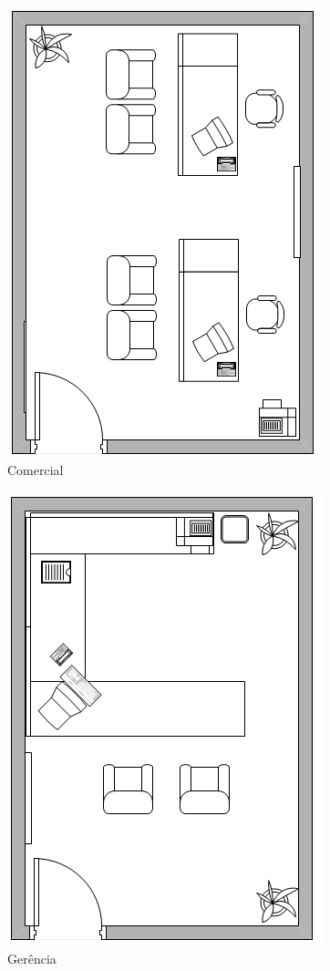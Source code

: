 \documentclass[	DIV=calc,%
							paper=a4,%
							fontsize=12pt,%
							onecolumn]{scrartcl}	 					%
\begin{document}
\begin{figure}
	\centering
	\includegraphics[height=\textwidth,angle=90]{comercial}
	\caption{Comercial}
	\label{comercial}
\end{figure}

\begin{figure}
	\centering
	\includegraphics[height=\textwidth,angle=90]{gerencia}
	\caption{Gerência}
	\label{gerencia}
\end{figure}
\end{document}
